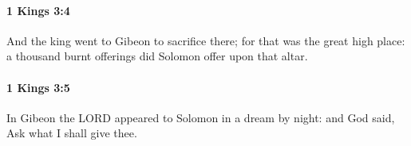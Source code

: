 		\paragraph{1 Kings 3:4} %
			\label{1KINGS-3-4}

			And the king went to Gibeon to sacrifice there; for that was the great high place: a thousand burnt offerings did Solomon offer upon that altar.


		\paragraph{1 Kings 3:5} %
			\label{1KINGS-3-5}

			In Gibeon the LORD appeared to Solomon in a dream by night: and God said, Ask what I shall give thee.


